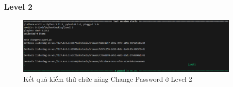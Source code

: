 \subsubsection{Level 2}
\begin{figure}[H]
    \centering
    \includegraphics[width=0.8\linewidth]{image/results-change-password-lv2.png}
    \caption{Kết quả kiểm thử chức năng Change Password ở Level 2}
    \label{fig:enter-label}
\end{figure}

